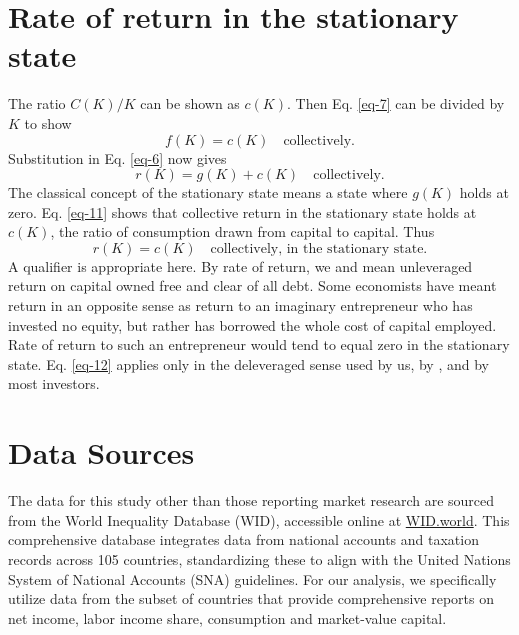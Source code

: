 \documentclass[a4paper,fleqn]{cas-sc}
\begin{document}
\section{Rate of return in the stationary state}
The ratio \(C(K)/K\) can be shown as \(c(K)\). Then Eq. \eqref{eq-7} can be divided by \(K\) to show
\begin{equation}
f(K) = c(K) \quad \text{collectively.}\label{eq-10}
\end{equation}
Substitution in Eq. \eqref{eq-6} now gives
\begin{equation}
r(K) = g(K) + c(K) \quad \text{collectively.}\label{eq-11}
\end{equation}
The classical concept of the stationary state means a state where \(g(K)\) holds at zero. Eq. \eqref{eq-11} shows that collective return in the stationary state holds at \(c(K)\), the ratio of consumption drawn from capital to capital. Thus 
\begin{equation}
r(K) = c(K) \quad \text{collectively, in the stationary state.}\label{eq-12}
\end{equation}
A qualifier is appropriate here. By rate of return, we and \citeauthor{jorda2019} mean unleveraged return on capital owned free and clear of all debt. Some economists have meant return in an opposite sense as return to an imaginary entrepreneur who has invested no equity, but rather has borrowed the whole cost of capital employed. Rate of return to such an entrepreneur would tend to equal zero in the stationary state. Eq. \eqref{eq-12} applies only in the deleveraged sense used by us, by \citeauthor{jorda2019}, and by most investors.

\section{Data Sources}

The data for this study other than those reporting market research are sourced from the World Inequality Database (WID), accessible online at \href{https://wid.world}{WID.world}. This comprehensive database integrates data from national accounts and taxation records across 105 countries, standardizing these to align with the United Nations System of National Accounts (SNA) guidelines. For our analysis, we specifically utilize data from the subset of countries that provide comprehensive reports on net income, labor income share, consumption and market-value capital.
\end{document}

